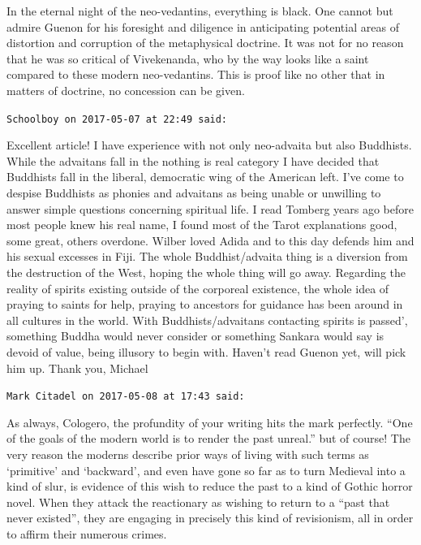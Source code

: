 \begin{footnotesize}
\begin{sffamily}
In the eternal night of the neo-vedantins, everything is black. One cannot but admire Guenon for his foresight and diligence in anticipating potential areas of distortion and corruption of the metaphysical doctrine. It was not for no reason that he was so critical of Vivekenanda, who by the way looks like a saint compared to these modern neo-vedantins. This is proof like no other that in matters of doctrine, no concession can be given.

\hfill

\texttt{Schoolboy on 2017-05-07 at 22:49 said:}

Excellent article! I have experience with not only neo-advaita but also Buddhists. While the advaitans fall in the nothing is real category I have decided that Buddhists fall in the liberal, democratic wing of the American left. I've come to despise Buddhists as phonies and advaitans as being unable or unwilling to answer simple questions concerning spiritual life. I read Tomberg years ago before most people knew his real name, I found most of the Tarot explanations good, some great, others overdone. Wilber loved Adida and to this day defends him and his sexual excesses in Fiji. The whole Buddhist/advaita thing is a diversion from the destruction of the West, hoping the whole thing will go away. Regarding the reality of spirits existing outside of the corporeal existence, the whole idea of praying to saints for help, praying to ancestors for guidance has been around in all cultures in the world. With Buddhists/advaitans contacting spirits is passed', something Buddha would never consider or something Sankara would say is devoid of value, being illusory to begin with. Haven't read Guenon yet, will pick him up. Thank you, Michael

\hfill

\texttt{Mark Citadel on 2017-05-08 at 17:43 said:}

As always, Cologero, the profundity of your writing hits the mark perfectly. ``One of the goals of the modern world is to render the past unreal.'' but of course! The very reason the moderns describe prior ways of living with such terms as `primitive' and `backward', and even have gone so far as to turn Medieval into a kind of slur, is evidence of this wish to reduce the past to a kind of Gothic horror novel. When they attack the reactionary as wishing to return to a ``past that never existed'', they are engaging in precisely this kind of revisionism, all in order to affirm their numerous crimes.

\hfill


\end{sffamily}
\end{footnotesize}
